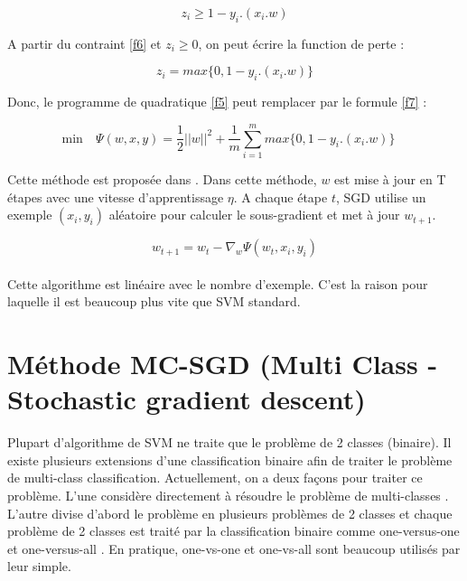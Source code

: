 \begin{equation}
z_i \geq 1 - y_i.(x_i.w)
\label{f6}
\end{equation}

A partir du contraint \ref{f6} et $z_i \geq 0$, on peut écrire la function de perte :

\begin{equation}
z_i = max\lbrace0, 1 - y_i.(x_i.w)\rbrace
\label{f7}
\end{equation}

Donc, le programme de quadratique \ref{f5} peut remplacer par le formule \ref{f7} :

\begin{equation}
\mbox{min}\quad \Psi(w, x, y) = \frac{1}{2} ||w||^2 + \frac{1}{m}\sum\limits_{i=1}^m max\lbrace0, 1 - y_i.(x_i.w)\rbrace\quad
\label{f7}
\end{equation}

Cette méthode est proposée dans \cite{sss07}. Dans cette méthode, $w$ est mise à jour en T étapes avec une vitesse d'apprentissage $\eta$. A chaque étape $t$, SGD utilise un exemple $(x_i, y_i)$ aléatoire pour calculer le sous-gradient et met à jour $w_{t+1}$. 

\begin{equation}
w_{t+1} = w_t - \nabla_w{\Psi(w_t, x_i, y_i)}
\label{f8}
\end{equation}
\\

Cette algorithme est linéaire avec le nombre d'exemple. C'est la raison pour laquelle il est beaucoup plus vite que SVM standard. 


\section{Méthode MC-SGD (Multi Class - Stochastic gradient descent)}
Plupart d'algorithme de SVM ne traite que le problème de 2 classes (binaire). Il existe plusieurs extensions d'une classification binaire afin de traiter le problème de multi-class classification. Actuellement, on a deux façons pour traiter ce problème. L'une considère directement à résoudre le problème de multi-classes \cite{ww99, yg07}. L'autre divise d'abord le problème en plusieurs problèmes de 2 classes et chaque problème de 2 classes est traité par la classification binaire comme one-versus-one \cite{vv95} et one-versus-all \cite{uk99}. En pratique, one-vs-one et one-vs-all sont beaucoup utilisés par leur simple.\\

